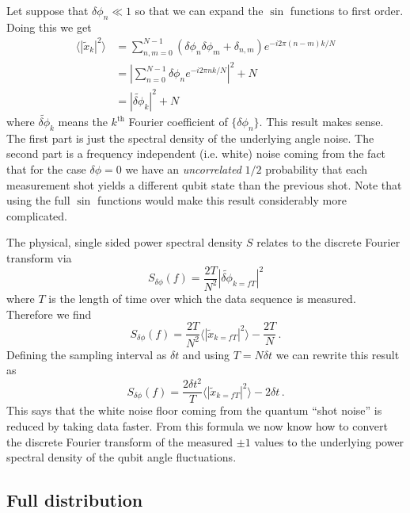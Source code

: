 \documentclass[twocolumn]{article}
\begin{document}
Let suppose that $\delta \phi_n \ll 1$ so that we can expand the $\sin$ functions to first order.
Doing this we get
\begin{align}
\langle |\tilde{x}_k|^2 \rangle
&= \sum_{n,m=0}^{N-1} \left( \delta \phi_n \delta \phi_m + \delta_{n,m} \right) e^{-i 2 \pi (n-m) k / N} \nonumber \\
&= \left| \sum_{n=0}^{N-1} \delta \phi_n e^{-i 2 \pi n k / N} \right|^2 + N \nonumber \\
&= \left| \tilde{\delta \phi}_k \right|^2 + N
\end{align}
where $\tilde{\delta \phi}_k$ means the $k^\text{th}$ Fourier coefficient of $\{ \delta \phi_n \}$.
This result makes sense.
The first part is just the spectral density of the underlying angle noise.
The second part is a frequency independent (i.e. white) noise coming from the fact that for the case $\delta \phi = 0$ we have an \emph{uncorrelated} $1/2$ probability that each measurement shot yields a different qubit state than the previous shot.
Note that using the full $\sin$ functions would make this result considerably more complicated.


The physical, single sided power spectral density $S$ relates to the discrete Fourier transform via
\begin{equation}
S_{\delta \phi}(f) = \frac{2T}{N^2} \left| \tilde{\delta \phi}_{k=fT} \right|^2
\end{equation}
where $T$ is the length of time over which the data sequence is measured.
Therefore we find
\begin{equation}
S_{\delta \phi}(f) = \frac{2T}{N^2} \langle \left| \tilde{x}_{k=fT} \right|^2 \rangle - \frac{2T}{N} \, .
\end{equation}
Defining the sampling interval as $\delta t$ and using $T = N \delta t$ we can rewrite this result as
\begin{equation}
S_{\delta \phi}(f) = \frac{2 \delta t^2}{T} \langle \left| \tilde{x}_{k=fT} \right|^2 \rangle - 2 \delta t \, .
\end{equation}
This says that the white noise floor coming from the quantum ``shot noise'' is reduced by taking data faster.
From this formula we now know how to convert the discrete Fourier transform of the measured $\pm 1$ values to the underlying power spectral density of the qubit angle fluctuations.

\subsection{Full distribution}
\end{document}
